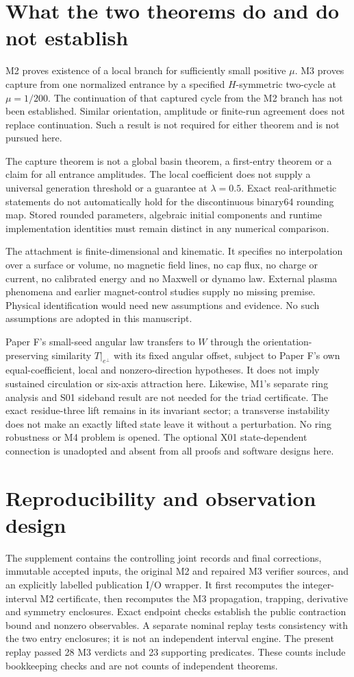 \documentclass[11pt,a4paper]{article}
\begin{document}
\section{What the two theorems do and do not establish}
M2 proves existence of a local branch for sufficiently small positive $\mu$. M3 proves capture from one normalized entrance by a specified $H$-symmetric two-cycle at $\mu=1/200$. The continuation of that captured cycle from the M2 branch has not been established. Similar orientation, amplitude or finite-run agreement does not replace continuation. Such a result is not required for either theorem and is not pursued here.

The capture theorem is not a global basin theorem, a first-entry theorem or a claim for all entrance amplitudes. The local coefficient does not supply a universal generation threshold or a guarantee at $\lambda=0.5$. Exact real-arithmetic statements do not automatically hold for the discontinuous binary64 rounding map. Stored rounded parameters, algebraic initial components and runtime implementation identities must remain distinct in any numerical comparison.

The attachment is finite-dimensional and kinematic. It specifies no interpolation over a surface or volume, no magnetic field lines, no cap flux, no charge or current, no calibrated energy and no Maxwell or dynamo law. External plasma phenomena and earlier magnet-control studies supply no missing premise. Physical identification would need new assumptions and evidence. No such assumptions are adopted in this manuscript.

Paper F's small-seed angular law transfers to $W$ through the orientation-preserving similarity $T|_{e^\perp}$ with its fixed angular offset, subject to Paper F's own equal-coefficient, local and nonzero-direction hypotheses. It does not imply sustained circulation or six-axis attraction here. Likewise, M1's separate ring analysis and S01 sideband result are not needed for the triad certificate. The exact residue-three lift remains in its invariant sector; a transverse instability does not make an exactly lifted state leave it without a perturbation. No ring robustness or M4 problem is opened. The optional X01 state-dependent connection is unadopted and absent from all proofs and software designs here.

\section{Reproducibility and observation design}
The supplement contains the controlling joint records and final corrections, immutable accepted inputs, the original M2 and repaired M3 verifier sources, and an explicitly labelled publication I/O wrapper. It first recomputes the integer-interval M2 certificate, then recomputes the M3 propagation, trapping, derivative and symmetry enclosures. Exact endpoint checks establish the public contraction bound and nonzero observables. A separate nominal replay tests consistency with the two entry enclosures; it is not an independent interval engine. The present replay passed 28 M3 verdicts and 23 supporting predicates. These counts include bookkeeping checks and are not counts of independent theorems.
\end{document}
